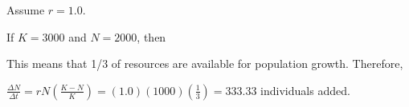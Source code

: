 \documentclass[t]{beamer}
\begin{document}
%
\begin{frame}
	\hangpara Assume $r = 1.0$.
	
	\hangpara If $K = 3000$ and $N = 2000$, \pause then
	
	
	\hangpara This means that 1/3 of resources are available for population growth. \pause Therefore,
	
	\hangpara $\frac{\Delta N}{\Delta t} = rN\left(\frac{K-N}{K}\right) = (1.0)(1000)(\frac{1}{3}) = 333.33$ individuals added.
\end{frame}
%
{
\begin{frame}
\end{frame}
}
%
\end{document}
